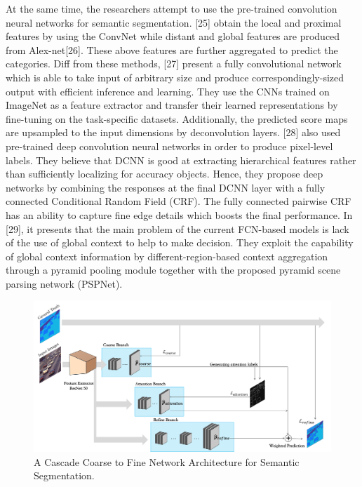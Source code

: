 \documentclass[10.5pt,compsoc]{TsT}
\theoremstyle{mystyle}
\begin{document}
{At the same time, the researchers attempt to use the pre-trained convolution neural networks for semantic segmentation. [25] obtain the local and proximal features by using the ConvNet while distant and global features are produced from Alex-net[26]. These above features are further aggregated to predict the categories. Diff from these methods, [27] present a fully convolutional network which is able to take input of arbitrary size and produce correspondingly-sized output with efficient inference and learning. They use the CNNs trained on ImageNet as a feature extractor and transfer their learned representations by fine-tuning on the task-specific datasets. Additionally, the predicted score maps are upsampled to the input dimensions by deconvolution layers. [28] also used pre-trained deep convolution neural networks in order to produce pixel-level labels. They believe that DCNN is good at extracting hierarchical features rather than sufficiently localizing for accuracy objects. Hence, they propose deep networks by combining the responses at the final DCNN layer with a fully connected Conditional Random Field (CRF). The fully connected pairwise CRF has an ability to capture fine edge details which boosts the final performance. In [29], it presents that the main problem of the current FCN-based models is lack of the use of global context to help to make decision. They exploit the capability of global context information by different-region-based context aggregation through a pyramid pooling module together with the proposed pyramid scene parsing network (PSPNet).

\begin{figure}[t]
\centering
\includegraphics[width=1.9\columnwidth]{fig2.png}
\caption{A Cascade Coarse to Fine Network Architecture for Semantic Segmentation.}
\label{fig:arch}
\end{figure} 

}
\end{document}
